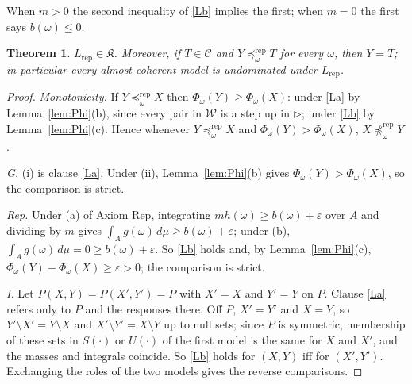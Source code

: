 \documentclass[11pt]{article}
\newtheorem{theorem}{Theorem}[section]
\theoremstyle{definition}
\theoremstyle{remark}
\newcommand{\C}{\mathcal C}
\newcommand{\K}{\mathfrak K}
\newcommand{\Lrep}{L_{\mathrm{rep}}}
\newcommand{\prep}{\preceq^{\mathrm{rep}}}
\begin{document}
When $m>0$ the second inequality of \ref{Lb} implies the first; when $m=0$ the first says $b(\omega)\le0$.

\begin{theorem}\label{thm:Lrep}
$\Lrep\in\K$. Moreover, if $T\in\C$ and $Y\prep_\omega T$ for every $\omega$, then $Y=T$; in particular every almost coherent model is undominated under $\Lrep$.
\end{theorem}
\begin{proof}
\emph{Monotonicity.} If $Y\prep_\omega X$ then $\Phi_\omega(Y)\ge\Phi_\omega(X)$: under \ref{La} by Lemma~\ref{lem:Phi}(b), since every pair in $\mathcal W$ is a step up in $\rhd$; under \ref{Lb} by Lemma~\ref{lem:Phi}(c). Hence whenever $Y\prep_\omega X$ and $\Phi_\omega(Y)>\Phi_\omega(X)$, $X\not\prep_\omega Y$.

\emph{G.} (i) is clause \ref{La}. Under (ii), Lemma~\ref{lem:Phi}(b) gives $\Phi_\omega(Y)>\Phi_\omega(X)$, so the comparison is strict.

\emph{Rep.} Under (a) of Axiom Rep, integrating $mh(\omega)\ge b(\omega)+\varepsilon$ over $A$ and dividing by $m$ gives $\int_Ag(\omega)\,d\mu\ge b(\omega)+\varepsilon$; under (b), $\int_Ag(\omega)\,d\mu=0\ge b(\omega)+\varepsilon$. So \ref{Lb} holds and, by Lemma~\ref{lem:Phi}(c), $\Phi_\omega(Y)-\Phi_\omega(X)\ge\varepsilon>0$; the comparison is strict.

\emph{I.} Let $P(X,Y)=P(X',Y')=P$ with $X'=X$ and $Y'=Y$ on $P$. Clause \ref{La} refers only to $P$ and the responses there. Off $P$, $X'=Y'$ and $X=Y$, so $Y'\setminus X'=Y\setminus X$ and $X'\setminus Y'=X\setminus Y$ up to null sets; since $P$ is symmetric, membership of these sets in $S(\cdot)$ or $U(\cdot)$ of the first model is the same for $X$ and $X'$, and the masses and integrals coincide. So \ref{Lb} holds for $(X,Y)$ iff for $(X',Y')$. Exchanging the roles of the two models gives the reverse comparisons.


\end{proof}
\end{document}
